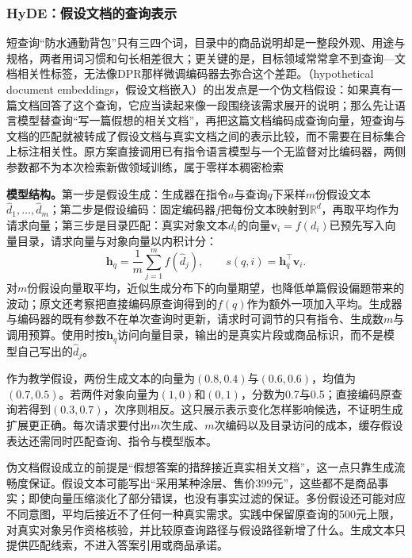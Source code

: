 \Needspace{100mm}
\subsubsection{HyDE：假设文档的查询表示}
\label{sec:rs-search-hyde}

短查询“防水通勤背包”只有三四个词，目录中的商品说明却是一整段外观、用途与规格，两者用词习惯和句长相差很大；更关键的是，目标领域常常拿不到查询—文档相关性标签，无法像DPR那样微调编码器去弥合这个差距。（hypothetical document embeddings，假设文档嵌入）的出发点是一个伪文档假设：如果真有一篇文档回答了这个查询，它应当读起来像一段围绕该需求展开的说明；那么先让语言模型替查询“写一篇假想的相关文档”，再把这篇文档编码成查询向量，短查询与文档的匹配就被转成了假设文档与真实文档之间的表示比较，而不需要在目标集合上标注相关性。原方案直接调用已有指令语言模型与一个无监督对比编码器，两侧参数都不为本次检索新做领域训练，属于零样本稠密检索

\textbf{模型结构。}第一步是假设生成：生成器在指令$a$与查询$q$下采样$m$份假设文本$\widehat d_1,\ldots,\widehat d_m$；第二步是假设编码：固定编码器$f$把每份文本映射到$\mathbb R^d$，再取平均作为请求向量；第三步是目录匹配：真实对象文本$d_i$的向量$\bm v_i=f(d_i)$已预先写入向量目录，请求向量与对象向量以内积计分：
\begin{equation}
 \bm h_q=\frac1m\sum_{j=1}^{m}f(\widehat d_j),
 \qquad s(q,i)=\bm h_q^\top\bm v_i.
 \label{eq:rs-search-hyde}
\end{equation}
对$m$份假设向量取平均，近似生成分布下的向量期望，也降低单篇假设偏题带来的波动；原文还考察把直接编码原查询得到的$f(q)$作为额外一项加入平均。生成器与编码器的既有参数不在单次查询时更新，请求时可调节的只有指令、生成数$m$与调用预算。使用时按$\bm h_q$访问向量目录，输出的是真实片段或商品标识，而不是模型自己写出的$\widehat d_j$。

作为教学假设，两份生成文本的向量为$(0.8,0.4)$与$(0.6,0.6)$，均值为$(0.7,0.5)$。若两件对象向量为$(1,0)$和$(0,1)$，分数为0.7与0.5；直接编码原查询若得到$(0.3,0.7)$，次序则相反。这只展示表示变化怎样影响候选，不证明生成扩展更正确。每次请求要付出$m$次生成、$m$次编码以及目录访问的成本，缓存假设表达还需同时匹配查询、指令与模型版本。

伪文档假设成立的前提是“假想答案的措辞接近真实相关文档”，这一点只靠生成流畅度保证。假设文本可能写出“采用某种涂层、售价399元”，这些都不是商品事实；即使向量压缩淡化了部分错误，也没有事实过滤的保证。多份假设还可能对应不同意图，平均后接近不了任何一种真实需求。实践中保留原查询的500元上限，对真实对象另作资格核验，并比较原查询路径与假设路径新增了什么。生成文本只提供匹配线索，不进入答案引用或商品承诺。

